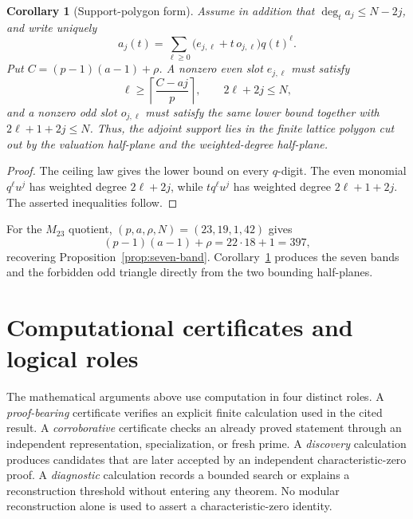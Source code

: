 \documentclass[11pt]{article}
\newtheorem{corollary}[theorem]{Corollary}
\begin{document}
\begin{corollary}[Support-polygon form]\label{cor:support-polygon}
Assume in addition that $\deg_t a_j\le N-2j$, and write uniquely
\[
 a_j(t)=\sum_{\ell\ge0}\bigl(e_{j,\ell}+t\,o_{j,\ell}\bigr)q(t)^\ell.
\]
Put $C=(p-1)(a-1)+\rho$.  A nonzero even slot $e_{j,\ell}$ must satisfy
\[
 \ell\ge\left\lceil\frac{C-aj}{p}\right\rceil,
 \qquad 2\ell+2j\le N,
\]
and a nonzero odd slot $o_{j,\ell}$ must satisfy the same lower bound together with
$2\ell+1+2j\le N$.  Thus, the adjoint support lies in the finite lattice polygon cut out by the valuation half-plane and the weighted-degree half-plane.
\end{corollary}

\begin{proof}
The ceiling law gives the lower bound on every $q$-digit.  The even monomial $q^\ell u^j$ has weighted degree $2\ell+2j$, while $tq^\ell u^j$ has weighted degree $2\ell+1+2j$.  The asserted inequalities follow.
\end{proof}

For the $M_{23}$ quotient, $(p,a,\rho,N)=(23,19,1,42)$ gives
\[
(p-1)(a-1)+\rho=22\cdot18+1=397,
\]
recovering Proposition~\ref{prop:seven-band}.  Corollary~\ref{cor:support-polygon} produces the seven bands and the forbidden odd triangle directly from the two bounding half-planes.
\section{Computational certificates and logical roles}\label{sec:certificates}
The mathematical arguments above use computation in four distinct roles.  A \emph{proof-bearing} certificate verifies an explicit finite calculation used in the cited result.  A \emph{corroborative} certificate checks an already proved statement through an independent representation, specialization, or fresh prime.  A \emph{discovery} calculation produces candidates that are later accepted by an independent characteristic-zero proof.  A \emph{diagnostic} calculation records a bounded search or explains a reconstruction threshold without entering any theorem.  No modular reconstruction alone is used to assert a characteristic-zero identity.
\end{document}
